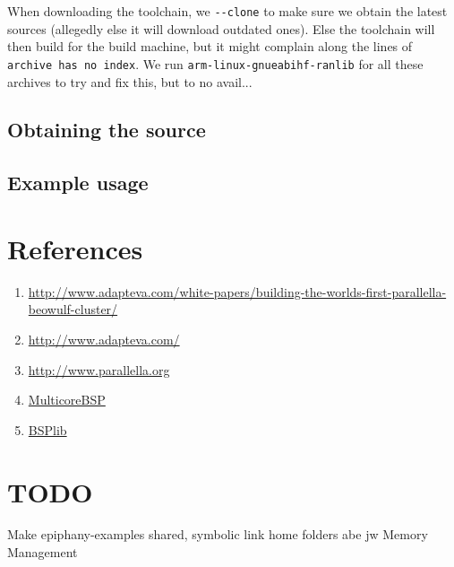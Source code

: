 \documentclass[fleqn]{article}
\renewcommand{\(}{\left(}
\renewcommand{\)}{\right)}
\begin{document}
When downloading the toolchain, we \verb+--clone+ to make sure we obtain the latest sources (allegedly else it will download outdated ones). Else the toolchain will then build for the build machine, but it might complain along the lines of \texttt{archive has no index}. We run \texttt{arm-linux-gnueabihf-ranlib} for all these archives to try and fix this, but to no avail...


\subsection{Obtaining the source}

\subsection{Example usage}

\section{References}

\begin{enumerate}
    \item \url{http://www.adapteva.com/white-papers/building-the-worlds-first-parallella-beowulf-cluster/}
    \item \url{http://www.adapteva.com/}
    \item \url{http://www.parallella.org}
    \item \url{MulticoreBSP}
    \item \url{BSPlib}
\end{enumerate}

\section{TODO}

Make epiphany-examples shared, symbolic link home folders abe jw
Memory Management
\end{document}
